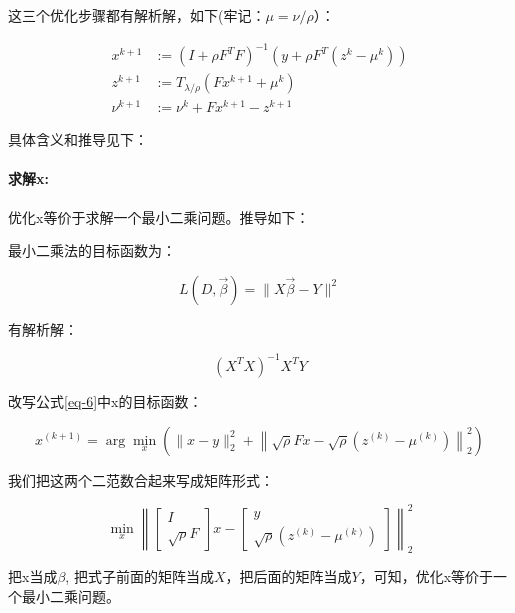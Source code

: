 \documentclass[10pt]{article}
\begin{document}
这三个优化步骤都有解析解，如下(牢记：$\mu = \nu / \rho$）：

\begin{equation}
\begin{aligned}
x^{k+1} &:=\left(I+\rho F^{T} F\right)^{-1}\left(y+\rho F^{T}\left(z^{k}-\mu^{k}\right)\right) \\
z^{k+1} &:=T_{\lambda / \rho}\left(F x^{k+1}+\mu^{k}\right) \\
\nu^{k+1} &:=\nu^{k}+F x^{k+1}-z^{k+1}
\end{aligned}
\end{equation}

具体含义和推导见下：

\paragraph{求解x: }

优化x等价于求解一个最小二乘问题。推导如下：

最小二乘法的目标函数为：

\begin{equation}
L(D, \vec{\beta})=\|X \vec{\beta}-Y\|^{2}
\end{equation}

有解析解：

\begin{equation}
	(X^TX)^{-1}X^TY
\end{equation}

改写公式\ref{eq-6}中x的目标函数：

\begin{equation}
	x ^{(k+1)} =\arg \min _{ x }\left(\|x-y\|_{2}^{2}+ \left\|\sqrt{\rho}Fx- \sqrt{\rho}(z ^{(k)}- \mu ^{(k)})\right\|_{2}^{2}\right)
\end{equation}

我们把这两个二范数合起来写成矩阵形式：

\begin{equation}
\min _{x}\left\|\left[\begin{array}{c} 
I \\
\sqrt{\rho} F
\end{array}\right] x -\left[\begin{array}{c} 
y \\
\sqrt{\rho}\left( z ^{(k)}- \mu ^{(k)}\right)
\end{array}\right]\right\|_{2}^{2}
\end{equation}

把x当成$\beta$, 把式子前面的矩阵当成$X$，把后面的矩阵当成$Y$，可知，优化x等价于一个最小二乘问题。
\end{document}
